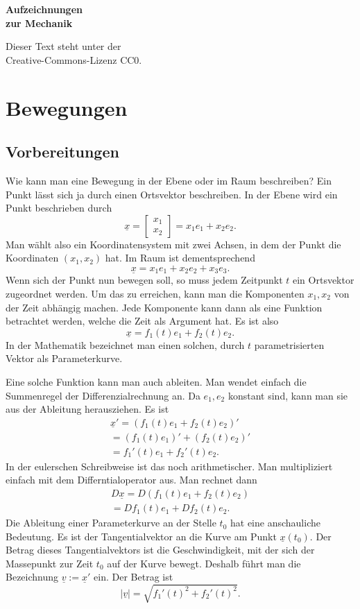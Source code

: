 \documentclass[a4paper,10pt,fleqn,twocolumn,twoside]{article}
\begin{document}
\thispagestyle{empty}

\begin{huge}
\noindent
\textbf{Aufzeichnungen\\
zur Mechanik}
\par
\end{huge}
\vspace{1em}

\noindent
Dieser Text steht unter der\\
Creative-Commons-Lizenz CC0.

\tableofcontents

\section{Bewegungen}

\subsection{Vorbereitungen}

Wie kann man eine Bewegung in der Ebene oder im Raum beschreiben?
Ein Punkt lässt sich ja durch einen Ortsvektor beschreiben. In der
Ebene wird ein Punkt beschrieben durch
\[\underline x
= \begin{bmatrix}x_1\\ x_2\end{bmatrix}
= x_1e_1+x_2e_2.\]
Man wählt also ein Koordinatensystem mit zwei Achsen, in dem der
Punkt die Koordinaten $(x_1,x_2)$ hat. Im Raum ist dementsprechend
\[\underline x = x_1e_1+x_2e_2+x_3e_3.\]
Wenn sich der Punkt nun bewegen soll, so muss jedem Zeitpunkt $t$
ein Ortsvektor zugeordnet werden. Um das zu erreichen, kann man die
Komponenten $x_1,x_2$ von der Zeit abhängig machen. Jede Komponente
kann dann als eine Funktion betrachtet werden, welche die Zeit als
Argument hat. Es ist also
\[\underline x = f_1(t)e_1+f_2(t)e_2.\]
In der Mathematik bezeichnet man einen solchen, durch $t$
parametrisierten Vektor als Parameterkurve.

Eine solche Funktion kann man auch ableiten. Man wendet einfach die
Summenregel der Differenzialrechnung an. Da $e_1,e_2$ konstant sind,
kann man sie aus der Ableitung herausziehen. Es ist
\begin{gather*}
\underline x' = (f_1(t)e_1+f_2(t)e_2)'\\
= (f_1(t)e_1)'+(f_2(t)e_2)'\\
= f_1'(t)e_1+f_2'(t)e_2.
\end{gather*}
In der eulerschen Schreibweise ist das noch arithmetischer.
Man multipliziert einfach mit dem Differntialoperator aus.
Man rechnet dann
\begin{gather*}
D\underline x = D(f_1(t)e_1+f_2(t)e_2)\\
= Df_1(t)e_1+Df_2(t)e_2.
\end{gather*}
Die Ableitung einer Parameterkurve an der Stelle $t_0$ hat eine
anschauliche Bedeutung. Es ist der Tangentialvektor an die Kurve
am Punkt $\underline x(t_0)$. Der Betrag dieses Tangentialvektors
ist die Geschwindigkeit, mit der sich der Massepunkt zur Zeit $t_0$
auf der Kurve bewegt. Deshalb führt man die Bezeichnung
$\underline v:=\underline x'$ ein. Der Betrag ist
\[|\underline v| = \sqrt{f_1'(t)^2+f_2'(t)^2}.\]
\end{document}
